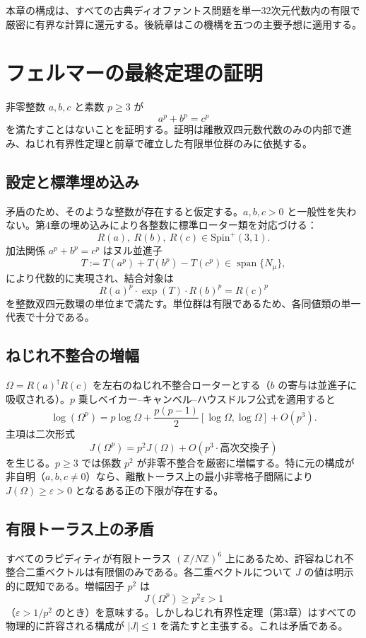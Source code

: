 \documentclass[a4paper]{article}
\theoremstyle{definition}
\begin{document}
本章の構成は、すべての古典ディオファントス問題を単一32次元代数内の有限で厳密に有界な計算に還元する。後続章はこの機構を五つの主要予想に適用する。

\section{フェルマーの最終定理の証明}

非零整数 $a, b, c$ と素数 $p \geq 3$ が
\[
a^p + b^p = c^p
\]
を満たすことはないことを証明する。証明は離散双四元数代数のみの内部で進み、ねじれ有界性定理と前章で確立した有限単位群のみに依拠する。

\subsection{設定と標準埋め込み}

矛盾のため、そのような整数が存在すると仮定する。$a, b, c > 0$ と一般性を失わない。第4章の埋め込みにより各整数に標準ローター類を対応づける：
\[
R(a),\ R(b),\ R(c) \in \mathrm{Spin}^+(3,1).
\]
加法関係 $a^p + b^p = c^p$ はヌル並進子
\[
T := T(a^p) + T(b^p) - T(c^p) \in \operatorname{span}\{N_\mu\},
\]
により代数的に実現され、結合対象は
\[
R(a)^p \cdot \exp(T) \cdot R(b)^p = R(c)^p
\]
を整数双四元数環の単位まで満たす。単位群は有限であるため、各同値類の単一代表で十分である。

\subsection{ねじれ不整合の増幅}

$\Omega = R(a)^\dagger R(c)$ を左右のねじれ不整合ローターとする（$b$ の寄与は並進子に吸収される）。$p$ 乗しベイカー--キャンベル--ハウスドルフ公式を適用すると
\[
\log(\Omega^p) = p \log \Omega + \frac{p(p-1)}{2} [\log \Omega, \log \Omega] + O(p^3).
\]
主項は二次形式
\[
J(\Omega^p) = p^2 J(\Omega) + O(p^3 \cdot \text{高次交換子})
\]
を生じる。$p \geq 3$ では係数 $p^2$ が非零不整合を厳密に増幅する。特に元の構成が非自明（$a,b,c \neq 0$）なら、離散トーラス上の最小非零格子間隔により $J(\Omega) \geq \varepsilon > 0$ となるある正の下限が存在する。

\subsection{有限トーラス上の矛盾}

すべてのラピディティが有限トーラス $(\mathbb{Z}/N\mathbb{Z})^6$ 上にあるため、許容ねじれ不整合二重ベクトルは有限個のみである。各二重ベクトルについて $J$ の値は明示的に既知である。増幅因子 $p^2$ は
\[
J(\Omega^p) \geq p^2 \varepsilon > 1
\]
（$\varepsilon > 1/p^2$ のとき）を意味する。しかしねじれ有界性定理（第3章）はすべての物理的に許容される構成が $|J| \leq 1$ を満たすと主張する。これは矛盾である。
\end{document}
